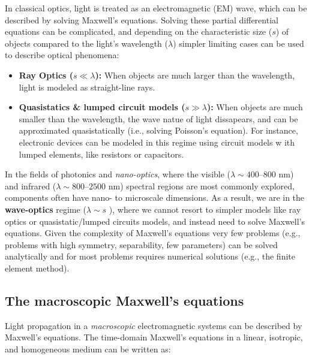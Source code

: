 In classical optics, light is treated as an electromagnetic (EM) wave, which can be described by 
solving Maxwell's equations. Solving these partial differential equations can be complicated, and 
depending on the characteristic size ($s$) of objects compared to the light's wavelength ($\lambda$) 
simpler limiting cases can be used to describe optical phenomena:
\begin{itemize}
    \item \textbf{Ray Optics ($s \ll \lambda$):} When objects are much larger than the wavelength, light is modeled as straight-line rays.
    \item \textbf{Quasistatics \& lumped circuit models ($s \gg \lambda$):} When objects are much smaller than the wavelength, the wave natue of light dissapears, 
    and can be approximated quasistatically (i.e., solving Poisson's equation). For instance, electronic devices can be modeled in this regime using circuit models w
    ith lumped elements, like resistors or capacitors. 
\end{itemize}
In the fields of photonics and \emph{nano-optics}, where the visible 
(\(\lambda \sim 400\)--\(800\) nm) and infrared (\(\lambda \sim 800\)--\(2500\) nm)
 spectral regions are most commonly explored, components often have nano- to
  microscale dimensions. As a result, we are in the \textbf{wave-optics} regime ($\lambda \sim s$ ),  
  where we cannot resort to simpler models like ray optics or quasistatic/lumped circuits models,
  and instead need to solve Maxwell's equations. Given the complexity of Maxwell's
  equations very few problems (e.g., problems with high symmetry, separability, few parameters) 
  can be solved analytically and for most problems requires 
  numerical solutions (e.g., the finite element method).


\subsection*{The macroscopic Maxwell's equations}

Light propagation in a \emph{macroscopic} electromagnetic systems can be described by Maxwell's equations. The time-domain Maxwell's 
equations in a linear, isotropic, and homogeneous medium can be written as:


